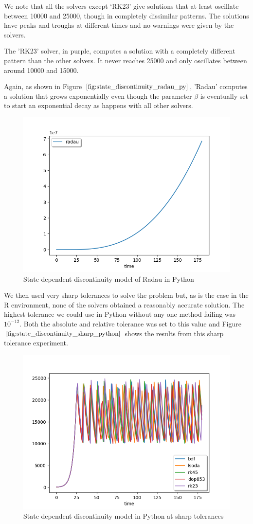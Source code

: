 We note that all the solvers except `RK23' give solutions that at least oscillate between 10000 and 25000, though in completely dissimilar patterns. The solutions have peaks and troughs at different times and no warnings were given by the solvers.

The 'RK23' solver, in purple, computes a solution with a completely different pattern than the other solvers. It never reaches 25000 and only oscillates between around 10000 and 15000. 

Again, as shown in Figure $\ref{fig:state_discontinuity_radau_py}$, 'Radau' computes a solution that grows exponentially even though the parameter $\beta$ is eventually set to start an exponential decay as happens with all other solvers.

\begin{figure}[h]
\centering
\includegraphics[width=0.7\linewidth]{./figures/state_discontinuity_radau_py}
\caption{State dependent discontinuity model of Radau in Python}
\label{fig:state_discontinuity_radau_py}
\end{figure}

We then used very sharp tolerances to solve the problem but, as is the case in the R environment, none of the solvers obtained a reasonably accurate solution. The highest tolerance we could use in Python without any one method failing was $10^{-12}$. Both the absolute and relative tolerance was set to this value and Figure $\ref{fig:state_discontinuity_sharp_python}$ shows the results from this sharp tolerance experiment.

\begin{figure}[h]
\centering
\includegraphics[width=0.7\linewidth]{./figures/state_discontinuity_sharp_py}
\caption{State dependent discontinuity model in Python at sharp tolerances}
\label{fig:state_discontinuity_sharp_python}
\end{figure}

